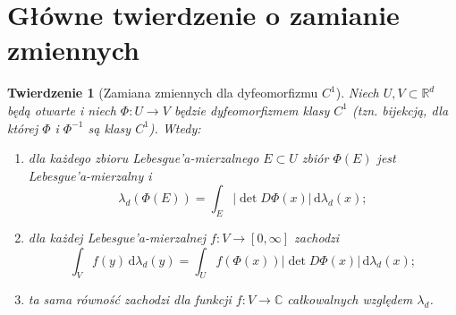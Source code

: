 \documentclass[11pt,a4paper,oneside]{book}
\numberwithin{equation}{chapter}
\theoremstyle{plain}
\newtheorem{twierdzenie}{Twierdzenie}[chapter]
\theoremstyle{definition}
\theoremstyle{remark}
\begin{document}
\section{Główne twierdzenie o zamianie zmiennych}

\begin{twierdzenie}[Zamiana zmiennych dla dyfeomorfizmu $C^1$]
\label{thm:change-variables-13}
Niech $U,V\subset\mathbb R^d$ będą otwarte i niech
$\Phi:U\to V$ będzie dyfeomorfizmem klasy $C^1$
(tzn. bijekcją, dla której $\Phi$ i $\Phi^{-1}$
są klasy $C^1$). Wtedy:
\begin{enumerate}[label=\textup{(\roman*)}]
\item dla każdego zbioru Lebesgue'a-mierzalnego $E\subset U$
zbiór $\Phi(E)$ jest Lebesgue'a-mierzalny i
\begin{equation}\label{eq:change-sets-13}
\lambda_d(\Phi(E))=\int_E |\det D\Phi(x)|\,
\mathrm d\lambda_d(x);
\end{equation}
\item dla każdej Lebesgue'a-mierzalnej
$f:V\to[0,\infty]$ zachodzi
\begin{equation}\label{eq:change-main-13}
\int_V f(y)\,\mathrm d\lambda_d(y)
=\int_U f(\Phi(x))|\det D\Phi(x)|\,
\mathrm d\lambda_d(x);
\end{equation}
\item ta sama równość zachodzi dla funkcji
$f:V\to\mathbb C$ całkowalnych względem $\lambda_d$.
\end{enumerate}
\end{twierdzenie}
\end{document}
